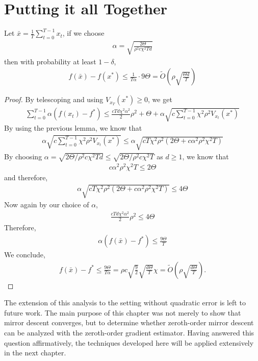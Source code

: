 \section{Putting it all Together}
\begin{theorem}
    Let $\bar x = \frac{1}{T} \sum_{t=0}^{T-1} x_t$, if we choose
    \begin{align*}
        \alpha = \sqrt{\frac{2\Theta}{\rho^2 c \chi^{2} T d}}
    \end{align*}
    then with probability at least $1-\delta$,
    \begin{align*}
        f(\bar x) - f(x^*) \leq \frac{1}{T\alpha} \cdot 9\Theta = \widetilde{O}\left(\rho \sqrt{\frac{\Theta d}{T}}\right)
    \end{align*}
\end{theorem}
\begin{proof}
    By telescoping and using $V_{x_T}(x^*) \geq 0$, we get
    \begin{align*}
        \sum_{t=0}^{T-1} \alpha (f(x_t) - f^*) \leq \frac{cTd \chi^{2} \alpha^2}{2} \rho^2 + \Theta + \alpha \sqrt{c \sum_{t=0}^{T-1} \chi^2 \rho^2 V_{x_t}(x^*)}
    \end{align*}
    By using the previous lemma, we know that
    \begin{align*}
        \alpha \sqrt{c \sum_{t=0}^{T-1} \chi^{2} \rho^2 V_{x_t}(x^*)} \leq \alpha \sqrt{cT\chi^{2} \rho^2(2\Theta + c \alpha^2 \rho^2 \chi^{2} T)}
    \end{align*}
    By choosing $\alpha = \sqrt{2\Theta / \rho^2 c \chi^{2} T d}\leq \sqrt{2\Theta / \rho^2 c \chi^{2} T}$ as $d \geq 1$, we know that
    \begin{align*}
        c \alpha^2 \rho^2 \chi^{2} T \leq 2\Theta
    \end{align*}
    and therefore,
    \begin{align*}
        \alpha \sqrt{cT\chi^{2} \rho^2(2\Theta + c \alpha^2 \rho^2 \chi^{2} T)} \leq 4\Theta
    \end{align*}
    Now again by our choice of $\alpha$,
    \begin{align*}
        \frac{cT d \chi^{2} \alpha^2}{2} \rho^2 \leq 4\Theta
    \end{align*}
    Therefore,
    \begin{align*}
        \alpha (f(\bar x) - f^*) \leq \frac{9\Theta}{T}
    \end{align*}
    We conclude,
    \begin{align*}
        f(\bar x) - f^* \leq \frac{9\Theta}{T \alpha} = \rho c \sqrt{\frac 92} \sqrt{\frac{d\Theta}{T}} \chi = \widetilde{O}\left(\rho \sqrt{\frac{d \Theta}{T}}\right).
    \end{align*}
\end{proof}

The extension of this analysis to the setting without quadratic error is left to future work. The main purpose of this chapter was not merely to show that mirror descent converges, but to determine whether zeroth-order mirror descent can be analyzed with the zeroth-order gradient estimator. Having answered this question affirmatively, the techniques developed here will be applied extensively in the next chapter.
